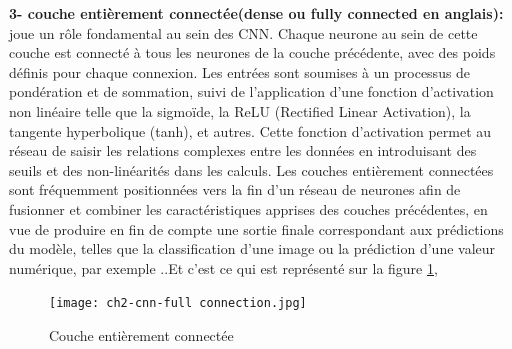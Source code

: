 \textbf{3- couche entièrement connectée(dense ou fully connected en anglais):}
joue un rôle fondamental au sein des CNN. Chaque neurone au sein de cette couche est connecté à tous les neurones de la couche précédente, avec des poids définis pour chaque connexion. Les entrées sont soumises à un processus de pondération et de sommation, suivi de l'application d'une fonction d'activation non linéaire telle que la sigmoïde, la ReLU (Rectified Linear Activation), la tangente hyperbolique (tanh), et autres. Cette fonction d'activation permet au réseau de saisir les relations complexes entre les données en introduisant des seuils et des non-linéarités dans les calculs. Les couches entièrement connectées sont fréquemment positionnées vers la fin d'un réseau de neurones afin de fusionner et combiner les caractéristiques apprises des couches précédentes, en vue de produire en fin de compte une sortie finale correspondant aux prédictions du modèle, telles que la classification d'une image ou la prédiction d'une valeur numérique, par exemple \cite{makina-corpus}..Et c'est ce qui est représenté sur la figure \ref{fig:fully},
\begin{figure}[H]
	\centering
	\texttt{[image: ch2-cnn-full connection.jpg]}
	\caption{Couche entièrement connectée}
 \label{fig:fully}
\end{figure}


